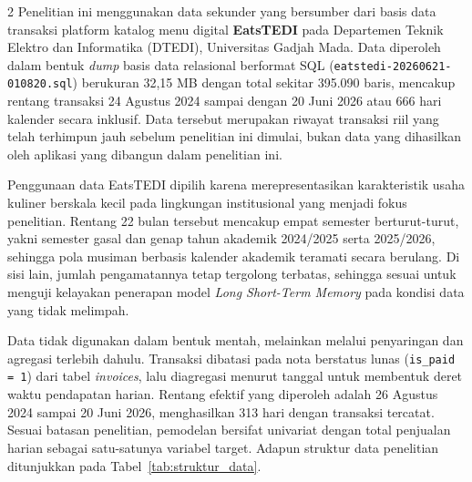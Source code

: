 \documentclass[12pt, a4paper, onecolumn, oneside]{report}
\begin{document}
\begin{spacing}{2}
Penelitian ini menggunakan data sekunder yang bersumber dari basis data transaksi platform katalog menu digital \textbf{EatsTEDI} pada Departemen Teknik Elektro dan Informatika (DTEDI), Universitas Gadjah Mada. Data diperoleh dalam bentuk \textit{dump} basis data relasional berformat SQL (\texttt{eatstedi-20260621-010820.sql}) berukuran 32,15 MB dengan total sekitar 395.090 baris, mencakup rentang transaksi 24 Agustus 2024 sampai dengan 20 Juni 2026 atau 666 hari kalender secara inklusif. Data tersebut merupakan riwayat transaksi riil yang telah terhimpun jauh sebelum penelitian ini dimulai, bukan data yang dihasilkan oleh aplikasi yang dibangun dalam penelitian ini.

Penggunaan data EatsTEDI dipilih karena merepresentasikan karakteristik usaha kuliner berskala kecil pada lingkungan institusional yang menjadi fokus penelitian. Rentang 22 bulan tersebut mencakup empat semester berturut-turut, yakni semester gasal dan genap tahun akademik 2024/2025 serta 2025/2026, sehingga pola musiman berbasis kalender akademik teramati secara berulang. Di sisi lain, jumlah pengamatannya tetap tergolong terbatas, sehingga sesuai untuk menguji kelayakan penerapan model \textit{Long Short-Term Memory} pada kondisi data yang tidak melimpah.

Data tidak digunakan dalam bentuk mentah, melainkan melalui penyaringan dan agregasi terlebih dahulu. Transaksi dibatasi pada nota berstatus lunas (\texttt{is\_paid = 1}) dari tabel \textit{invoices}, lalu diagregasi menurut tanggal untuk membentuk deret waktu pendapatan harian. Rentang efektif yang diperoleh adalah 26 Agustus 2024 sampai 20 Juni 2026, menghasilkan 313 hari dengan transaksi tercatat. Sesuai batasan penelitian, pemodelan bersifat univariat dengan total penjualan harian sebagai satu-satunya variabel target. Adapun struktur data penelitian ditunjukkan pada Tabel~\ref{tab:struktur_data}.


\end{spacing}
\end{document}
